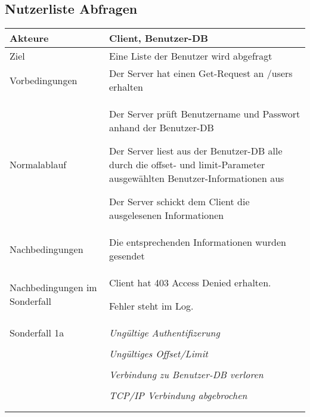 \documentclass[a4paper,10pt,titlepage]{article}
\makeatletter
\newcommand\novspace{\@minipagetrue}
\newenvironment{owncompactitem}{%
\compactitem
}{%
\@finalstrut\@arstrutbox
\@nameuse{endcompactitem}%
\aftergroup\let\aftergroup\@finalstrut\aftergroup\@gobble
}
\newenvironment{owncompactenum}{%
\compactenum
}{%
\@finalstrut\@arstrutbox
\@nameuse{endcompactenum}%
\aftergroup\let\aftergroup\@finalstrut\aftergroup\@gobble
}
\newcommand{\usecase}[7]
{\subsection{#1}
\setlength{\extrarowheight}{2pt}
\begin{tabular}{|p{0.2\textwidth}|p{0.9\textwidth}|}
\hline
  Akteure & #2\\\hline
  Ziel & #3\\\hline
  Vorbedingungen & \novspace
  	\begin{owncompactitem}[-] #4 \end{owncompactitem} \\\hline
  Normalablauf & \vspace{-7pt}
  	\begin{owncompactenum}[1.] #6 \end{owncompactenum} \\\hline
  Nachbedingungen & \novspace
  	\begin{owncompactitem}[-] #5 \end{owncompactitem} \\\hline
  #7
\end{tabular}
}
\newcommand{\sonderfall}[4][\empty]
{
Sonderfall #2 & \vspace{-10pt}
	\textit{#3}
	\begin{owncompactenum}[{#2}.1] {#4} \end{owncompactenum}
  	\ifthenelse{\equal{#1}{\empty}}
    	{\\\hline} %
    	{\ensuremath{\rightarrow} #1 \\ [+1pt] \hline} %

}
\newcommand{\sondernachbedingung}[1]
{
Nachbedingungen im Sonderfall& \novspace
	\begin{owncompactitem}[-]
		#1
	\end{owncompactitem} \\\hline
}
\makeatother
\begin{document}
\usecase{Nutzerliste Abfragen}{Client, Benutzer-DB}%
{Eine Liste der Benutzer wird abgefragt}%
{%
  \item Der Server hat einen Get-Request an /users erhalten
}
{%
  \item Die entsprechenden Informationen wurden gesendet
}
{%
  \item Der Server prüft Benutzername und Passwort anhand der Benutzer-DB
  \item Der Server liest aus der Benutzer-DB alle durch die offset- und limit-Parameter ausgewählten Benutzer-Informationen aus
  \item Der Server schickt dem Client die ausgelesenen Informationen
}
{%
  \sondernachbedingung{
	\item Client hat 403 Access Denied erhalten.
	\item Fehler steht im Log.
	}
		\sonderfall[Weiter mit normalem Betrieb]{1a}
    {Ungültige Authentifizerung}
    {
    \item Fehler wird ins Log geschrieben
  	\item Der Client erhält eine entsprechende Fehlermeldung mit HTTP-Status 403 Access Denied
    }

	\sonderfall[Weiter mit normalem Betrieb]{2a}%
	{Ungültiges Offset/Limit}%
  	{
	\item Der Fehler wird ins Log geschrieben
	\item Der Client erhält eine entsprechende Fehlermeldung
  	}
  	    
	\sonderfall[Kritischer Fehler, Server ist beendet]{*}%
	{Verbindung zu Benutzer-DB verloren}%
  	{
	\item Der Fehler wird ins Log geschrieben (als schwerwiegender Fehler)
	\item Der Client erhält eine entsprechende Fehlermeldung
	\item Der Server wird beendet
  	}

\sonderfall[Weiter mit normalem Betrieb]{**}%
	{TCP/IP Verbindung abgebrochen}%
	{
	\item Fehlermeldung wird ins Log geschrieben
	}
}
\end{document}
